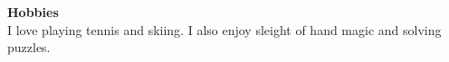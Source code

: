 \documentclass[9pt]{resume}
\begin{document}
        

    {\Large \textbf{Hobbies}}
        \\I love playing tennis and skiing. I also enjoy sleight of hand magic and solving puzzles. 
\end{document}
